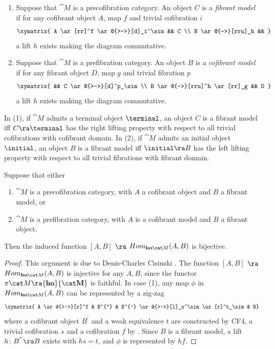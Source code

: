 \begin{defn}
\label{defn:fibrmodel}
\mbox{}
\begin{enumerate}
\item
Suppose that ${\cat M}$ is a precofibration category. An object $C$ is a {\it fibrant model} if for any cofibrant object $A$, map $f$ and trivial cofibration $i$ 
\[
\xymatrix{
  A \ar[rr]^f \ar@{>->}[d]_i^\sim && C \\
  B \ar@{-->}[rru]_h &&
}
\]
a lift $h$ exists making the diagram commutative. 
\item
Suppose that ${\cat M}$ is a prefibration category. An object $B$ is a {\it cofibrant model} if for any fibrant object $D$, map $g$ and trivial fibration $p$ 
\[
\xymatrix{
  && C \ar@{>->}[d]^p_\sim \\
  B \ar@{-->}[rru]^h \ar[rr]_g && D
}
\]
a lift $h$ exists making the diagram commutative. 
\end{enumerate}
\end{defn}

In (1), if ${\cat M}$ admits a terminal object $\terminal$, an object $C$ is a fibrant model iff $C \ra \terminal$ has the right lifting property with respect to all trivial cofibrations with cofibrant domain. In (2), if ${\cat M}$ admits an initial object $\initial$, an object $B$ is a fibrant model iff $\initial \ra B$ has the left lifting property with respect to all trivial fibrations with fibrant domain. 

\begin{prop}
\label{prop:smallhomotopycat}
Suppose that either
\begin{enumerate}
\item
${\cat M}$ is a precofibration category, with $A$ a cofibrant object and $B$ a fibrant model, or
\item
${\cat M}$ is a prefibration category, with $A$ is a cofibrant model and $B$ a fibrant object.
\end{enumerate}

Then the induced function $[A, B]$ $\ra$ $Hom_{{\bf ho}{\cat M}}(A, B)$ is bijective.
\end{prop}

\begin{proof}
This argument is due to Denis-Charles Cisinski \cite{Cisinski2}. The function $[A, B]$ $\ra$ $Hom_{{\bf ho}{\cat M}}(A, B)$ is injective for any $A, B$, since the functor $\pi{\cat M} \ra {\bf ho}{\cat M}$ is faithful. In case (1), any map $\phi$ in $Hom_{{\bf ho}{\cat M}}(A, B)$ can be represented by a zig-zag
\[
\xymatrix{ A \ar@{>->}[r]^f & B^{''} & B^{'} \ar@{>->}[l]_s^\sim \ar[r]^t_\sim & B}
\]
where a cofibrant object $B^{'}$ and a weak equivalence $t$ are constructed by CF4, a trivial cofibration $s$ and a cofibration $f$ by . Since $B$ is a fibrant model, a lift $h \colon B^{''} \ra B$ exists with $hs = t$, and  $\phi$ is represented by $hf$.
\end{proof}

